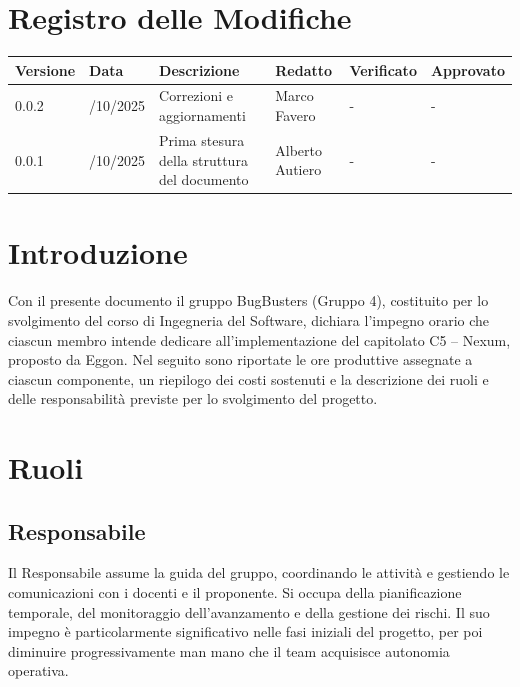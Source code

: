 \documentclass[a4paper,11pt]{article}
\newcommand{\CurrentVersion}{0.0.2}
\begin{document}
\newpage

\section*{Registro delle Modifiche}


\setlength{\extrarowheight}{2pt} %
\renewcommand{\arraystretch}{1.5} 

{\footnotesize
\begin{tabularx}{\textwidth}{|>{\raggedright\arraybackslash}p{1.5cm}|>{\raggedright\arraybackslash}p{2cm}|X|>{\raggedright\arraybackslash}p{2cm}|>{\raggedright\arraybackslash}p{2cm}|>{\raggedright\arraybackslash}p{2cm}|}
\hline
\rowcolor{primaryblue!40}
\textbf{\color{white} Versione} & \textbf{\color{white} Data} & \textbf{\color{white} Descrizione} & \textbf{\color{white} Redatto} & \textbf{\color{white} Verificato} & \textbf{\color{white} Approvato} \\
\hline
\rowcolor{secondaryblue!10} \CurrentVersion & 26/10/2025 & Correzioni e aggiornamenti & Marco Favero & - & - \\
\hline
\rowcolor{secondaryblue!10} 0.0.1 & 23/10/2025 & Prima stesura della struttura del documento & Alberto Autiero & - & - \\
\hline

\end{tabularx}
}




\newpage
\tableofcontents
\newpage

\section{Introduzione}
Con il presente documento il gruppo BugBusters (Gruppo 4), costituito per lo svolgimento del corso di Ingegneria del Software, dichiara l'impegno orario che ciascun membro intende dedicare all'implementazione del capitolato C5 -- Nexum, proposto da Eggon. Nel seguito sono riportate le ore produttive assegnate a ciascun componente, un riepilogo dei costi sostenuti e la descrizione dei ruoli e delle responsabilità previste per lo svolgimento del progetto.

\newpage

\section{Ruoli}

\subsection{Responsabile}
Il Responsabile assume la guida del gruppo, coordinando le attività e gestiendo le comunicazioni con i docenti e il proponente. Si occupa della pianificazione temporale, del monitoraggio dell'avanzamento e della gestione dei rischi. Il suo impegno è particolarmente significativo nelle fasi iniziali del progetto, per poi diminuire progressivamente man mano che il team acquisisce autonomia operativa.
\end{document}
